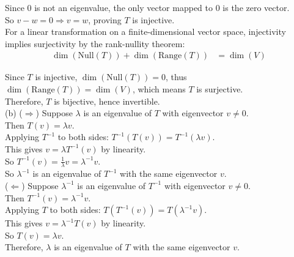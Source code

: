 \documentclass{article}
\begin{document}
Since $0$ is not an eigenvalue, the only vector mapped to $0$ is the zero vector. \\

So $v-w = 0 \Rightarrow v = w$, proving $T$ is injective. \\

For a linear transformation on a finite-dimensional vector space, injectivity implies surjectivity by the rank-nullity theorem:
\begin{align*}
\dim(\text{Null}(T)) + \dim(\text{Range}(T)) &= \dim(V)
\end{align*}

Since $T$ is injective, $\dim(\text{Null}(T)) = 0$, thus $\dim(\text{Range}(T)) = \dim(V)$, which means $T$ is surjective. \\

Therefore, $T$ is bijective, hence invertible. \\

(b) ($\Rightarrow$) Suppose $\lambda$ is an eigenvalue of $T$ with eigenvector $v \neq 0$. \\

Then $T(v) = \lambda v$. \\

Applying $T^{-1}$ to both sides: $T^{-1}(T(v)) = T^{-1}(\lambda v)$. \\

This gives $v = \lambda T^{-1}(v)$ by linearity. \\

So $T^{-1}(v) = \frac{1}{\lambda}v = \lambda^{-1}v$. \\

So $\lambda^{-1}$ is an eigenvalue of $T^{-1}$ with the same eigenvector $v$. \\

($\Leftarrow$) Suppose $\lambda^{-1}$ is an eigenvalue of $T^{-1}$ with eigenvector $v \neq 0$. \\

Then $T^{-1}(v) = \lambda^{-1}v$. \\

Applying $T$ to both sides: $T(T^{-1}(v)) = T(\lambda^{-1}v)$. \\

This gives $v = \lambda^{-1}T(v)$ by linearity. \\

So $T(v) = \lambda v$. \\

Therefore, $\lambda$ is an eigenvalue of $T$ with the same eigenvector $v$.
\end{document}
